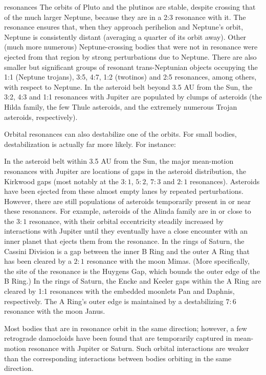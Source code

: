 \begin{itemize}
\begin{frame}[allowframebreaks]{resonances}
    The orbits of Pluto and the plutinos are stable, despite crossing that of the much larger Neptune, because they are in a 2:3 resonance with it. The resonance ensures that, when they approach perihelion and Neptune's orbit, Neptune is consistently distant (averaging a quarter of its orbit away). Other (much more numerous) Neptune-crossing bodies that were not in resonance were ejected from that region by strong perturbations due to Neptune. There are also smaller but significant groups of resonant trans-Neptunian objects occupying the 1:1 (Neptune trojans), 3:5, 4:7, 1:2 (twotinos) and 2:5 resonances, among others, with respect to Neptune.
    In the asteroid belt beyond 3.5 AU from the Sun, the 3:2, 4:3 and 1:1 resonances with Jupiter are populated by clumps of asteroids (the Hilda family, the few Thule asteroids, and the extremely numerous Trojan asteroids, respectively).

Orbital resonances can also destabilize one of the orbits. For small bodies, destabilization is actually far more likely. For instance:

    In the asteroid belt within 3.5 AU from the Sun, the major mean-motion resonances with Jupiter are locations of gaps in the asteroid distribution, the Kirkwood gaps (most notably at the $3:1$, $5:2$, $7:3$ and $2:1$ resonances). Asteroids have been ejected from these almost empty lanes by repeated perturbations. However, there are still populations of asteroids temporarily present in or near these resonances. For example, asteroids of the Alinda family are in or close to the $3:1$ resonance, with their orbital eccentricity steadily increased by interactions with Jupiter until they eventually have a close encounter with an inner planet that ejects them from the resonance.
    In the rings of Saturn, the Cassini Division is a gap between the inner B Ring and the outer A Ring that has been cleared by a $2:1$ resonance with the moon Mimas. (More specifically, the site of the resonance is the Huygens Gap, which bounds the outer edge of the B Ring.)
    In the rings of Saturn, the Encke and Keeler gaps within the A Ring are cleared by 1:1 resonances with the embedded moonlets Pan and Daphnis, respectively. The A Ring's outer edge is maintained by a destabilizing $7:6$ resonance with the moon Janus.

Most bodies that are in resonance orbit in the same direction; however, a few retrograde damocloids have been found that are temporarily captured in mean-motion resonance with Jupiter or Saturn. Such orbital interactions are weaker than the corresponding interactions between bodies orbiting in the same direction.


\end{frame}
\end{itemize}
